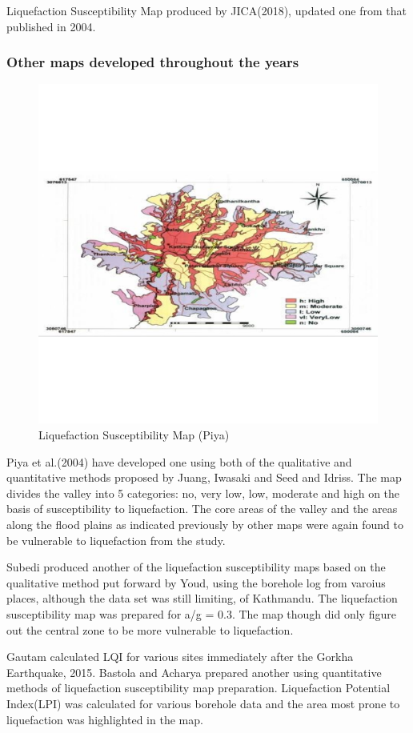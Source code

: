Liquefaction Susceptibility Map produced by JICA(2018), updated one from that published in 2004.

\subsubsection{Other maps developed throughout the years}

\begin{figure}[!hbt]
\centering
\includegraphics[width=0.75\linewidth,keepaspectratio]{images/main/piya.png}
\caption{ Liquefaction Susceptibility Map (Piya)}
\end{figure}

Piya et al.(2004) have developed one using both of the qualitative and quantitative methods proposed by Juang\cite{r25}, Iwasaki\cite{r26} and Seed and Idriss\cite{r12}. The map divides the valley into 5 categories: no, very low, low, moderate and high on the basis of susceptibility to liquefaction. The core areas of the valley and the areas along the flood plains as indicated previously by other maps were again found to be vulnerable to liquefaction from the study.

Subedi\cite{r28} produced another of the liquefaction susceptibility maps based on the qualitative method put forward by Youd\cite{r27}, using the borehole log from varoius places, although the data set was still limiting, of Kathmandu. The liquefaction susceptibility map was prepared for a/g = 0.3. The map though did only figure out the central zone to be more vulnerable to liquefaction. 

Gautam\cite{r18} calculated LQI for various sites immediately after the Gorkha Earthquake, 2015. Bastola and Acharya\cite{r31} prepared another using quantitative methods of  liquefaction susceptibility map preparation. Liquefaction Potential Index(LPI) was calculated for various borehole data and the area most prone to liquefaction was highlighted in the map. 

